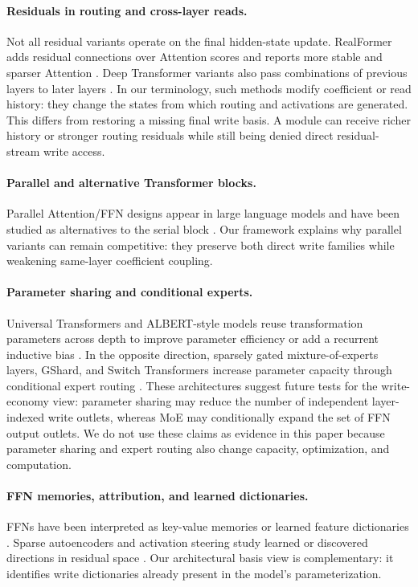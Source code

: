 \documentclass[letterpaper]{article}
\begin{document}
\paragraph{Residuals in routing and cross-layer reads.}
Not all residual variants operate on the final hidden-state update. RealFormer
adds residual connections over Attention scores and reports more stable and
sparser Attention \citep{he2021realformer}. Deep Transformer variants also pass
combinations of previous layers to later layers \citep{wang2019learning}. In
our terminology, such methods modify coefficient or read history: they change
the states from which routing and activations are generated. This differs from
restoring a missing final write basis. A module can receive richer history or
stronger routing residuals while still being denied direct residual-stream
write access.

\paragraph{Parallel and alternative Transformer blocks.}
Parallel Attention/FFN designs appear in large language models and have been
studied as alternatives to the serial block
\citep{black2022gptneox,chowdhery2023palm,sonkar2023paf}. Our framework
explains why parallel variants can remain competitive: they preserve both
direct write families while weakening same-layer coefficient coupling.

\paragraph{Parameter sharing and conditional experts.}
Universal Transformers and ALBERT-style models reuse transformation parameters
across depth to improve parameter efficiency or add a recurrent inductive bias
\citep{dehghani2018universal,lan2019albert}. In the opposite direction,
sparsely gated mixture-of-experts layers, GShard, and Switch Transformers
increase parameter capacity through conditional expert routing
\citep{shazeer2017outrageously,lepikhin2020gshard,fedus2021switch}. These
architectures suggest future tests for the write-economy view: parameter
sharing may reduce the number of independent layer-indexed write outlets,
whereas MoE may conditionally expand the set of FFN output outlets. We do not
use these claims as evidence in this paper because parameter sharing and expert
routing also change capacity, optimization, and computation.

\paragraph{FFN memories, attribution, and learned dictionaries.}
FFNs have been interpreted as key-value memories or learned feature
dictionaries \citep{geva2021transformer}. Sparse autoencoders and activation
steering study learned or discovered directions in residual space
\citep{bricken2023monosemanticity,turner2023activation}. Our architectural
basis view is complementary: it identifies write dictionaries already present
in the model's parameterization.
\end{document}
